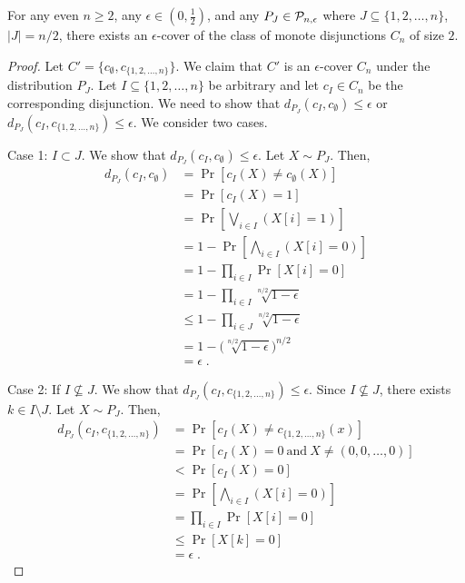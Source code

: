 \begin{lemma}
For any even $n \ge 2$, any $\epsilon \in (0,\frac{1}{2})$, and any $P_J \in
\P_{n,\epsilon}$ where $J \subseteq \{1,2,\dots,n\}$, $|J| = n/2$, there exists
an $\epsilon$-cover of the class of monote disjunctions $C_n$ of size $2$.
\end{lemma}

\begin{proof}
Let $C' = \{c_\emptyset, c_{\{1,2,\dots,n\}}\}$. We claim that $C'$ is an
$\epsilon$-cover $C_n$ under the distribution $P_J$. Let $I \subseteq
\{1,2,\dots,n\}$ be arbitrary and let $c_I \in C_n$ be the corresponding
disjunction. We need to show that $d_{P_J}(c_I, c_\emptyset) \le \epsilon$ or
$d_{P_J}(c_I, c_{\{1,2,\dots,n\}}) \le \epsilon$. We consider two cases.

Case 1: $I \subset J$. We show that $d_{P_J}(c_I, c_\emptyset) \le \epsilon$.
Let $X \sim P_J$. Then,
\begin{align*}
d_{P_J}(c_I, c_\emptyset)
& = \Pr[c_I(X) \neq c_\emptyset(X)] \\
& = \Pr[c_I(X) = 1] \\
& = \Pr \left[ \bigvee_{i \in I} (X[i] = 1) \right] \\
& = 1 - \Pr \left[ \bigwedge_{i \in I} (X[i] = 0) \right] \\
& = 1 - \prod_{i \in I} \Pr \left[ X[i] = 0 \right] \\
& = 1 - \prod_{i \in I} \sqrt[n/2]{1 - \epsilon} \\
& \le 1 - \prod_{i \in J} \sqrt[n/2]{1 - \epsilon} \\
& = 1 - \bigg( \sqrt[n/2]{1 - \epsilon} \bigg)^{n/2} \\
& = \epsilon \; .
\end{align*}

Case 2: If $I \not \subseteq J$. We show that $d_{P_J}(c_I, c_{\{1,2,\dots,n\}}) \le \epsilon$.
Since $I \not \subseteq J$, there exists $k \in I \setminus J$. Let $X \sim P_J$. Then,
\begin{align*}
d_{P_J}(c_I, c_{\{1,2,\dots,n\}})
& = \Pr [c_I(X) \neq c_{\{1,2,\dots,n\}}(x)] \\
& = \Pr [c_I(X) = 0 \ \text{and} \ X \neq (0,0,\dots,0) ] \\
& <  \Pr [c_I(X) = 0 ] \\
& = \Pr \left[ \bigwedge_{i \in I} (X[i] = 0) \right] \\
& = \prod_{i \in I} \Pr \left[ X[i] = 0 \right] \\
& \le \Pr \left[ X[k] = 0 \right] \\
& = \epsilon \; .
\end{align*}
\end{proof}

